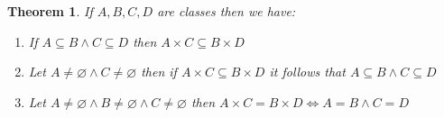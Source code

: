 \documentclass{book}
\newtheorem{theorem}{Theorem}
\begin{document}
\begin{theorem}
  \label{cartesian product and inclusion}If $A, B, C, D$ are classes then we
  have:
  \begin{enumerate}
    \item If $A \subseteq B \wedge C \subseteq D$ then $A \times C \subseteq B
    \times D$
    
    \item Let $A \neq \varnothing \wedge C \neq \varnothing$ then if $A \times
    C \subseteq B \times D$ it follows that $A \subseteq B \wedge C \subseteq
    D$
    
    \item Let $A \neq \varnothing \wedge B \neq \varnothing \wedge C \neq
    \varnothing$ then $A \times C = B \times D \Leftrightarrow A = B \wedge C
    = D$
  \end{enumerate}
\end{theorem}
\end{document}
